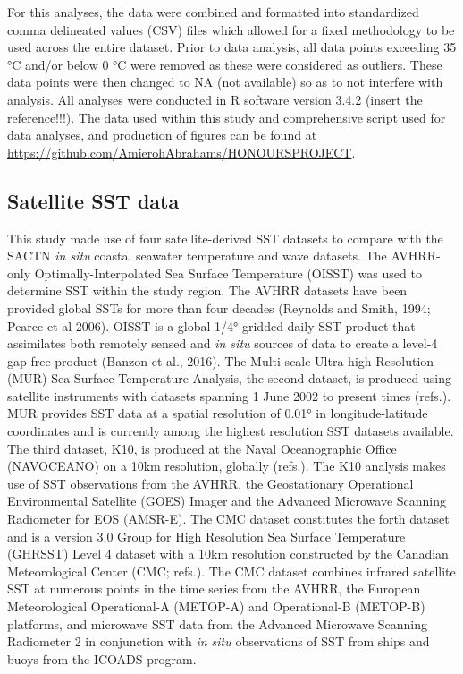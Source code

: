 \documentclass[12pt,a4paper,]{article}
\begin{document}
For this analyses, the data were combined and formatted into
standardized comma delineated values (CSV) files which allowed for a
fixed methodology to be used across the entire dataset. Prior to data
analysis, all data points exceeding 35 °C and/or below 0 °C were removed
as these were considered as outliers. These data points were then
changed to NA (not available) so as to not interfere with analysis. All
analyses were conducted in R software version 3.4.2 (insert the
reference!!!). The data used within this study and comprehensive script
used for data analyses, and production of figures can be found at
\url{https://github.com/AmierohAbrahams/HONOURSPROJECT}.

\hypertarget{satellite-sst-data}{%
\subsection{Satellite SST data}\label{satellite-sst-data}}

This study made use of four satellite-derived SST datasets to compare
with the SACTN \emph{in situ} coastal seawater temperature and wave
datasets. The AVHRR-only Optimally-Interpolated Sea Surface Temperature
(OISST) was used to determine SST within the study region. The AVHRR
datasets have been provided global SSTs for more than four decades
(Reynolds and Smith, 1994; Pearce et al 2006). OISST is a global 1/4°
gridded daily SST product that assimilates both remotely sensed and
\emph{in situ} sources of data to create a level-4 gap free product
(Banzon et al., 2016). The Multi-scale Ultra-high Resolution (MUR) Sea
Surface Temperature Analysis, the second dataset, is produced using
satellite instruments with datasets spanning 1 June 2002 to present
times (refs.). MUR provides SST data at a spatial resolution of 0.01° in
longitude-latitude coordinates and is currently among the highest
resolution SST datasets available. The third dataset, K10, is produced
at the Naval Oceanographic Office (NAVOCEANO) on a 10km resolution,
globally (refs.). The K10 analysis makes use of SST observations from
the AVHRR, the Geostationary Operational Environmental Satellite (GOES)
Imager and the Advanced Microwave Scanning Radiometer for EOS (AMSR-E).
The CMC dataset constitutes the forth dataset and is a version 3.0 Group
for High Resolution Sea Surface Temperature (GHRSST) Level 4 dataset
with a 10km resolution constructed by the Canadian Meteorological Center
(CMC; refs.). The CMC dataset combines infrared satellite SST at
numerous points in the time series from the AVHRR, the European
Meteorological Operational-A (METOP-A) and Operational-B (METOP-B)
platforms, and microwave SST data from the Advanced Microwave Scanning
Radiometer 2 in conjunction with \emph{in situ} observations of SST from
ships and buoys from the ICOADS program.
\end{document}
